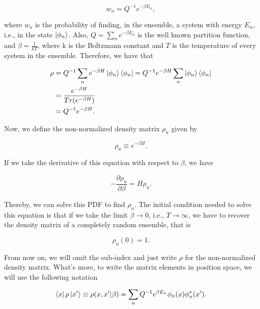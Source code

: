 \documentclass{article}
\begin{document}
\begin{equation}
    w_{n} = Q^{-1} e^{-\beta E_{n}},
\end{equation}

where $w_{n}$ is the probability of finding, in the ensemble, a system with energy $E_{n}$, i.e., in the state $\ket{\phi_n}$.
Also, $Q = \sum_{n} e^{-\beta E_{n}}$ is the well known partition function, and $\beta = \frac{1}{k T}$, where k is the Boltzmann constant and $T$ is the temperature of every system in the ensemble. Therefore, we have that

\begin{equation}
    \begin{split}
        \rho & = Q^{-1} \sum_{n} e^{-\beta H} \ket{\phi_n} \bra{\phi_n} = Q^{-1} e^{-\beta H} \sum_{n} \ket{\phi_n} \bra{\phi_n} \\ & = \frac{e^{-\beta H}}{Tr(e^{-\beta H})} \\ & = Q^{-1} e^{-\beta H}.
    \end{split}
\end{equation}

Now, we define the non-normalized density matrix $\rho_u$ given by

\begin{equation}
    \rho_u \equiv e^{-\beta H}.
\end{equation}

If we take the derivative of this equation with respect to $\beta$, we have

\begin{equation}\label{bloch_eq}
    - \frac{\partial \rho_u}{\partial \beta} = H \rho_u.
\end{equation}

Thereby, we can solve this PDF to find $\rho_u$. The initial condition needed to solve this equation is that if we take the limit $\beta \longrightarrow 0$, i.e., $T \longrightarrow \infty$, we have to recover the density matrix of a completely random ensemble, that is

\begin{equation}\label{bloch_eq_initial_cond}
    \rho_u(0) = 1.
\end{equation}

From now on, we will omit the sub-index and just write $\rho$ for the non-normalized density matrix. What's more, to write the matrix elements in position space, we will use the following notation

\begin{equation}
    \bra{x} \rho \ket{x'} \equiv \rho(x, x' | \beta) = \sum_{n} Q^{-1} e^{\beta E_{n}} \phi_n (x) \phi_{n}^{*} (x').
\end{equation}
\end{document}
